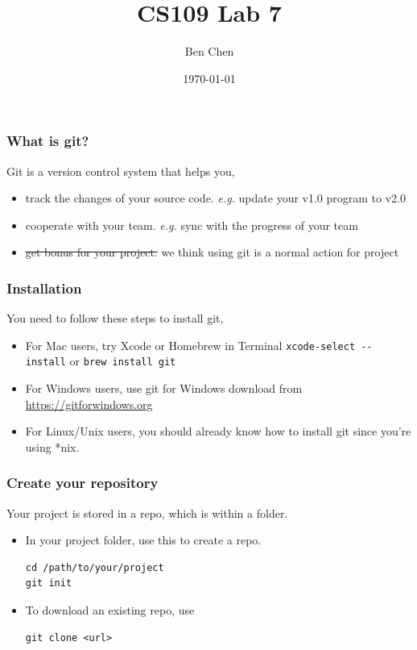 \documentclass{beamer}
\title{CS109 Lab 7} %
\author{Ben Chen}
\institute{SUSTech}
\date{\today}
\begin{document}
\frame{\titlepage}

\begin{frame}
    \frametitle{What is git?}
Git is a version control system that helps you,
\begin{itemize}
    \item track the changes of your source code.\newline
    \textit{e.g.} update your v1.0 program to v2.0
    \item cooperate with your team.\newline
    \textit{e.g.} sync with the progress of your team
    \item \sout{get bonus for your project.}\newline
    we think using git is a normal action for project
\end{itemize}
\end{frame}

\begin{frame}[fragile]
    \frametitle{Installation}
    You need to follow these steps to install git,
    \begin{itemize}
        \item For Mac users, try Xcode or Homebrew in Terminal\newline
        \lstinline|xcode-select --install| or \lstinline|brew install git|
        \item For Windows users, use git for Windows\newline
        download from \url{https://gitforwindows.org}
        \item For Linux/Unix users, you should already know how to install git since you're using *nix.
    \end{itemize}
\end{frame}

\begin{frame}[fragile]
    \frametitle{Create your repository}
Your project is stored in a repo, which is within a folder.
\begin{itemize}
    \item In your project folder, use this to create a repo.
    \begin{lstlisting}[morekeywords=git]
cd /path/to/your/project
git init
    \end{lstlisting}
    \item To download an existing repo, use
    \begin{lstlisting}[morekeywords=git]
git clone <url>
    \end{lstlisting}
\end{itemize}
\end{frame}
\end{document}
